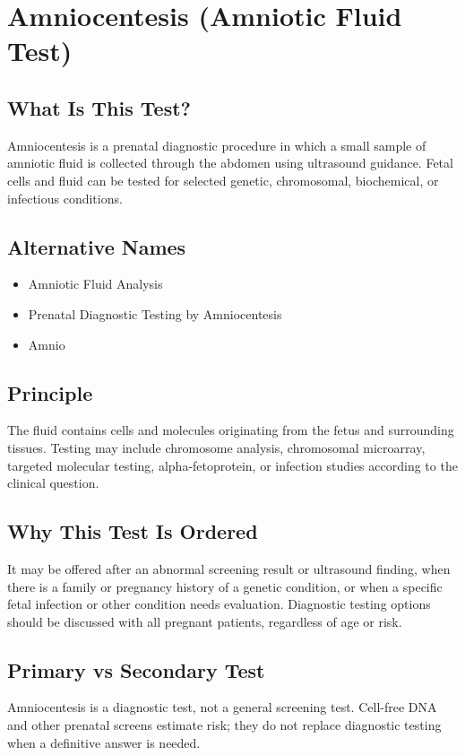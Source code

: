 \chapter{Amniocentesis (Amniotic Fluid Test)}

\section*{What Is This Test?}
Amniocentesis is a prenatal diagnostic procedure in which a small sample of amniotic fluid is collected through the abdomen using ultrasound guidance. Fetal cells and fluid can be tested for selected genetic, chromosomal, biochemical, or infectious conditions.

\section*{Alternative Names}
\begin{itemize}
  \item Amniotic Fluid Analysis
  \item Prenatal Diagnostic Testing by Amniocentesis
  \item Amnio
\end{itemize}

\section*{Principle}
The fluid contains cells and molecules originating from the fetus and surrounding tissues. Testing may include chromosome analysis, chromosomal microarray, targeted molecular testing, alpha-fetoprotein, or infection studies according to the clinical question.

\section*{Why This Test Is Ordered}
It may be offered after an abnormal screening result or ultrasound finding, when there is a family or pregnancy history of a genetic condition, or when a specific fetal infection or other condition needs evaluation. Diagnostic testing options should be discussed with all pregnant patients, regardless of age or risk.

\section*{Primary vs Secondary Test}
Amniocentesis is a diagnostic test, not a general screening test. Cell-free DNA and other prenatal screens estimate risk; they do not replace diagnostic testing when a definitive answer is needed.

